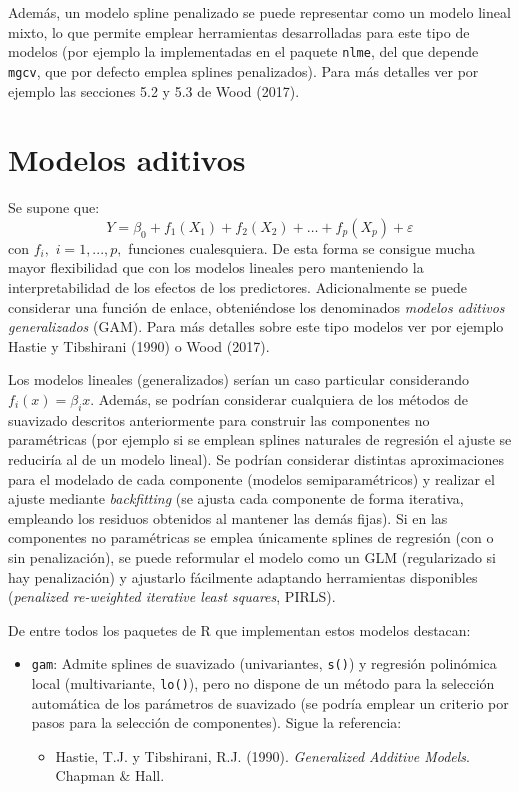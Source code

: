 \documentclass[
]{book}
\providecommand{\tightlist}{%
  \setlength{\itemsep}{0pt}\setlength{\parskip}{0pt}}
\theoremstyle{break}
\theoremstyle{definition}
\theoremstyle{definition}
\theoremstyle{definition}
\theoremstyle{definition}
\theoremstyle{remark}
\begin{document}
Además, un modelo spline penalizado se puede representar como un modelo lineal mixto, lo que permite emplear herramientas desarrolladas para este tipo de modelos (por ejemplo la implementadas en el paquete \texttt{nlme}, del que depende \texttt{mgcv}, que por defecto emplea splines penalizados).
Para más detalles ver por ejemplo las secciones 5.2 y 5.3 de Wood (2017).

\hypertarget{modelos-aditivos}{%
\section{Modelos aditivos}\label{modelos-aditivos}}

Se supone que:
\[Y= \beta_{0} + f_1(X_1) + f_2(X_2) + \ldots + f_p(X_p)  + \varepsilon\]
con \(f_{i},\) \(i=1,...,p,\) funciones cualesquiera.
De esta forma se consigue mucha mayor flexibilidad que con los modelos lineales pero manteniendo la interpretabilidad de los efectos de los predictores.
Adicionalmente se puede considerar una función de enlace, obteniéndose los denominados \emph{modelos aditivos generalizados} (GAM). Para más detalles sobre este tipo modelos ver por ejemplo Hastie y Tibshirani (1990) o Wood (2017).

Los modelos lineales (generalizados) serían un caso particular considerando \(f_{i}(x) = \beta_{i}x\).
Además, se podrían considerar cualquiera de los métodos de suavizado descritos anteriormente para construir las componentes no paramétricas (por ejemplo si se emplean splines naturales de regresión el ajuste se reduciría al de un modelo lineal).
Se podrían considerar distintas aproximaciones para el modelado de cada componente (modelos semiparamétricos) y realizar el ajuste mediante \emph{backfitting} (se ajusta cada componente de forma iterativa, empleando los residuos obtenidos al mantener las demás fijas).
Si en las componentes no paramétricas se emplea únicamente splines de regresión (con o sin penalización), se puede reformular el modelo como un GLM (regularizado si hay penalización) y ajustarlo fácilmente adaptando herramientas disponibles (\emph{penalized re-weighted iterative least squares}, PIRLS).

De entre todos los paquetes de R que implementan estos modelos destacan:

\begin{itemize}
\item
  \texttt{gam}: Admite splines de suavizado (univariantes, \texttt{s()}) y regresión polinómica local (multivariante, \texttt{lo()}), pero no dispone de un método para la selección automática de los parámetros de suavizado (se podría emplear un criterio por pasos para la selección de componentes).
  Sigue la referencia:

  \begin{itemize}
  \tightlist
  \item
    Hastie, T.J. y Tibshirani, R.J. (1990). \emph{Generalized Additive Models}. Chapman \& Hall.
  \end{itemize}
\end{itemize}
\end{document}
